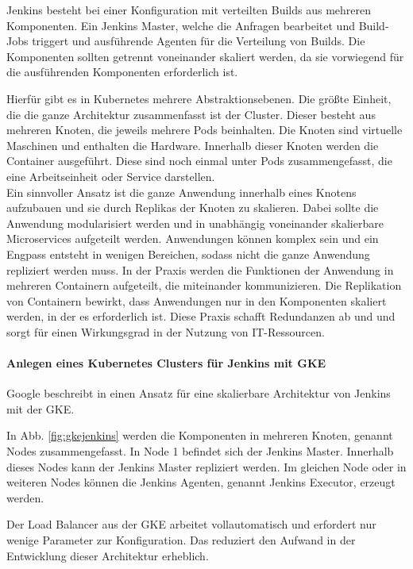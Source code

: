 Jenkins besteht bei einer Konfiguration mit verteilten Builds aus mehreren Komponenten. Ein Jenkins Master, welche die Anfragen bearbeitet und Build-Jobs triggert und ausführende Agenten für die Verteilung von Builds. Die Komponenten sollten getrennt voneinander skaliert werden, da sie vorwiegend für die ausführenden Komponenten erforderlich ist. 

Hierfür gibt es in Kubernetes mehrere Abstraktionsebenen. Die größte Einheit, die die ganze Architektur zusammenfasst ist der Cluster. Dieser besteht aus mehreren Knoten, die jeweils mehrere Pods beinhalten. Die Knoten sind virtuelle Maschinen und enthalten die Hardware. Innerhalb dieser Knoten werden die Container ausgeführt. Diese sind noch einmal unter Pods zusammengefasst, die eine Arbeitseinheit oder Service darstellen. 
\medskip
\\
Ein sinnvoller Ansatz ist die ganze Anwendung innerhalb eines Knotens aufzubauen und sie durch Replikas der Knoten zu skalieren. Dabei sollte die Anwendung modularisiert werden und in unabhängig voneinander skalierbare Microservices aufgeteilt werden. Anwendungen können komplex sein und ein Engpass entsteht in wenigen Bereichen, sodass nicht die ganze Anwendung repliziert werden muss. In der Praxis werden die Funktionen der Anwendung in mehreren Containern aufgeteilt, die miteinander kommunizieren. Die Replikation von Containern bewirkt, dass Anwendungen nur in den Komponenten skaliert werden, in der es erforderlich ist. Diese Praxis schafft Redundanzen ab und und sorgt für einen Wirkungsgrad in der Nutzung von IT-Ressourcen.

\paragraph{Anlegen eines Kubernetes Clusters für Jenkins mit GKE}

Google beschreibt in \cite{Google:GKEJenkins} einen Ansatz für eine skalierbare Architektur von Jenkins mit der \ac{GKE}.

In Abb. \ref{fig:gkejenkins} werden die Komponenten in mehreren Knoten, genannt Nodes zusammengefasst. In Node 1 befindet sich der Jenkins Master. Innerhalb dieses Nodes kann der Jenkins Master repliziert werden. Im gleichen Node oder in weiteren Nodes können die Jenkins Agenten, genannt Jenkins Executor, erzeugt werden.

Der Load Balancer aus der \ac{GKE} arbeitet vollautomatisch und erfordert nur wenige Parameter zur Konfiguration. Das reduziert den Aufwand in der Entwicklung dieser Architektur erheblich.

